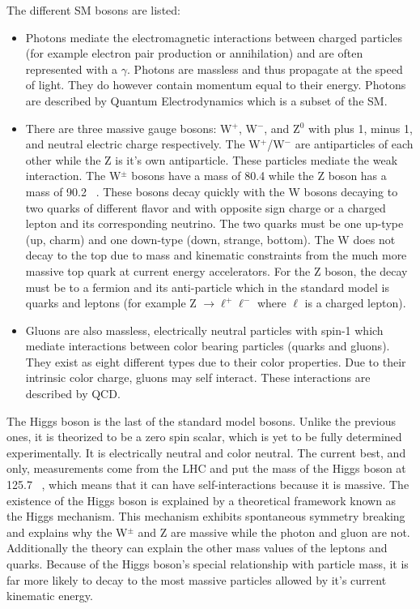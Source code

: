  The different SM bosons are listed:
 \begin{itemize}
 \item  Photons mediate the electromagnetic interactions between charged particles (for example electron pair production or annihilation) and are often represented with a $\gamma$. Photons are massless and thus propagate at the speed of light. They do however contain momentum equal to their energy. Photons are described by Quantum Electrodynamics which is a subset of the SM.\\
 \item There are three massive gauge bosons: W$^+$, W$^-$, and Z$^0$ with plus 1, minus 1, and neutral electric charge respectively. The W$^+$/W$^-$ are antiparticles of each other while the Z is it's own antiparticle. These particles mediate the weak interaction. The W$^{\pm}$ bosons have a mass of 80.4 \GeVcc while the Z boson has a mass of 90.2 \GeVcc~\cite{pdg}. These bosons decay quickly with the W bosons decaying to two quarks of different flavor and with opposite sign charge or a charged lepton and its corresponding neutrino. The two quarks must be one up-type (up, charm) and one down-type (down, strange, bottom). The W does not decay to the top due to mass and kinematic constraints from the much more massive top quark at current energy accelerators. For the Z boson, the decay must be to a fermion and its anti-particle which in the standard model is quarks and leptons (for example Z  $\rightarrow \ell^+ \ell^- $ where $\ell$ is a charged lepton).\\
 \item Gluons are also massless, electrically neutral particles with spin-1 which mediate interactions between color bearing particles (quarks and gluons). They exist as eight different types due to their color properties. Due to their intrinsic color charge, gluons may self interact. These interactions are described by QCD.\\
 \end{itemize} 
 

 
 The Higgs boson is the last of the standard model bosons. Unlike the previous ones, it is theorized to be a zero spin scalar, which is yet to be fully determined experimentally. It is electrically neutral and color neutral. The current best, and only, measurements come from the LHC and put the mass of the Higgs boson at 125.7 \GeVcc~\cite{discovery, higgstwiki}, which means that it can have self-interactions because it is massive. The existence of the Higgs boson is explained by a theoretical framework known as the Higgs mechanism. This mechanism exhibits spontaneous symmetry breaking and explains why the W$^{\pm}$ and Z are massive while the photon and gluon are not. Additionally the theory can explain the other mass values of the leptons and quarks. Because of the Higgs boson's special relationship with particle mass, it is far more likely to decay to the most massive particles allowed by it's current kinematic energy.\\ 
 
